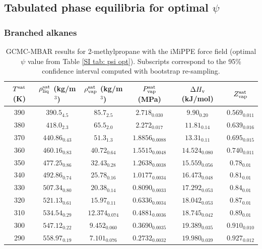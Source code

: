 \documentclass[journal=jctc,manuscript=article]{achemso}
\begin{document}
\subsection{Tabulated phase equilibria for optimal $\psi$}

\subsubsection{Branched alkanes}

\begin{table}[htb!]
	\caption{GCMC-MBAR results for 2-methylpropane with the iMiPPE force field (optimal $\psi$ value from Table \ref{SI tab: psi opt}). Subscripts correspond to the 95\% confidence interval computed with bootstrap re-sampling.}
	\begin{center}
		\begin{tabular}{|c|c|c|c|c|c|}
			\hline
			$T^{\rm sat}$ (K) & $\rho_{\rm liq}^{\rm sat}$ (kg/m$^3$) & $\rho_{\rm vap}^{\rm sat}$ (kg/m$^3$) & $P_{\rm vap}^{\rm sat}$ (MPa) & $\Delta H_{\rm v}$ (kJ/mol) & $Z_{\rm vap}^{\rm sat}$ \\ \hline
			390 & $390.5_{4.5}$ & $85.7_{2.5}$ & $2.718_{0.030}$ & $9.90_{0.20}$ & $0.569_{0.011}$ \\
			380 & $418.0_{2.3}$ & $65.5_{2.0}$ & $2.272_{0.017}$ & $11.81_{0.14}$ & $0.639_{0.016}$ \\
			370 & $440.86_{0.43}$ & $51.3_{1.3}$ & $1.8856_{0.0088}$ & $13.31_{0.11}$ & $0.695_{0.015}$ \\
			360 & $460.16_{0.83}$ & $40.72_{0.64}$ & $1.5515_{0.0048}$ & $14.524_{0.080}$ & $0.740_{0.011}$ \\
			350 & $477.25_{0.86}$ & $32.43_{0.28}$ & $1.2638_{0.0038}$ & $15.559_{0.056}$ & $0.78_{0.01}$ \\
			340 & $492.86_{0.74}$ & $25.78_{0.16}$ & $1.0177_{0.0034}$ & $16.473_{0.048}$ & $0.81_{0.01}$ \\
			330 & $507.34_{0.80}$ & $20.38_{0.14}$ & $0.8090_{0.0033}$ & $17.292_{0.053}$ & $0.84_{0.01}$ \\
			320 & $521.13_{0.61}$ & $15.97_{0.11}$ & $0.6336_{0.0034}$ & $18.042_{0.053}$ & $0.87_{0.01}$ \\
			310 & $534.54_{0.29}$ & $12.374_{0.074}$ & $0.4881_{0.0036}$ & $18.745_{0.042}$ & $0.89_{0.01}$ \\
			300 & $547.12_{0.22}$ & $9.452_{0.060}$ & $0.3690_{0.0035}$ & $19.389_{0.035}$ & $0.910_{0.010}$ \\
			290 & $558.97_{0.19}$ & $7.101_{0.076}$ & $0.2732_{0.0032}$ & $19.980_{0.039}$ & $0.927_{0.012}$ \\

\end{tabular}
\end{center}
\end{table}
\end{document}
